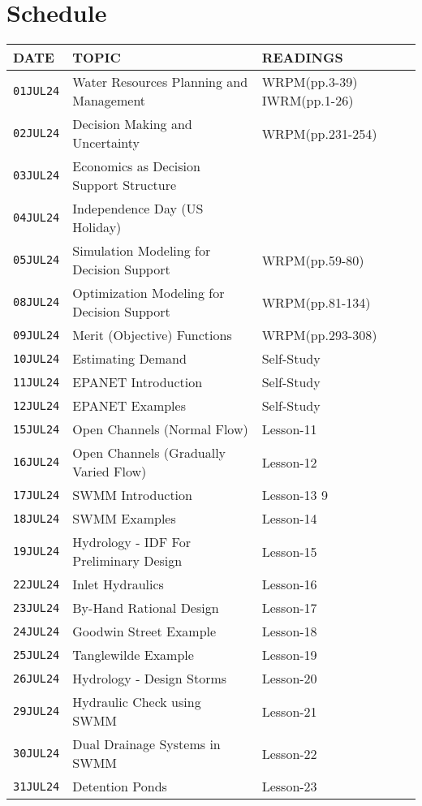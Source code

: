 \documentclass[12pt]{article}
\begin{document}
\section*{Schedule}
\begin{center}
\begin{table}[ht!]
   \begin{tabular}{| p{0.8in} | p{3.4in} | p{2.0in} |} 
\hline
\hline
DATE & TOPIC & READINGS  \\
\hline
\hline
\texttt{01JUL24} & Water Resources Planning and Management & WRPM(pp.3-39) IWRM(pp.1-26)  \\
\texttt{02JUL24} & Decision Making and Uncertainty &   WRPM(pp.231-254) ~~~~ \\
\texttt{03JUL24} & Economics as Decision Support Structure & \cite{JamesLee1971} ~~~~\\
\texttt{04JUL24} & Independence Day (US Holiday) &   \\
\texttt{05JUL24} & Simulation Modeling for Decision Support  & WRPM(pp.59-80)  \\
\hline
\hline
\texttt{08JUL24} & Optimization Modeling for Decision Support  & WRPM(pp.81-134)  \\
\texttt{09JUL24} & Merit (Objective) Functions & WRPM(pp.293-308)  \\
\texttt{10JUL24} & Estimating Demand & Self-Study  \\
\texttt{11JUL24} & EPANET Introduction & Self-Study  \\
\texttt{12JUL24} & EPANET Examples & Self-Study  \\
\hline
\hline
\texttt{15JUL24} & Open Channels (Normal Flow) & Lesson-11   \\
\texttt{16JUL24} & Open Channels (Gradually Varied Flow) & Lesson-12 \\
\texttt{17JUL24} & SWMM Introduction & Lesson-13 9 \\
\texttt{18JUL24} & SWMM Examples & Lesson-14 \\
\texttt{19JUL24} & Hydrology - IDF For Preliminary Design & Lesson-15  \\
\hline
\hline
\texttt{22JUL24} & Inlet Hydraulics & Lesson-16  \\
\texttt{23JUL24} & By-Hand Rational Design & Lesson-17  \\
\texttt{24JUL24} & Goodwin Street Example & Lesson-18  \\
\texttt{25JUL24} & Tanglewilde Example & Lesson-19  \\
\texttt{26JUL24} & Hydrology - Design Storms & Lesson-20  \\
\hline
\hline
\texttt{29JUL24} & Hydraulic Check using SWMM & Lesson-21  \\
\texttt{30JUL24} & Dual Drainage Systems in SWMM & Lesson-22  \\
\texttt{31JUL24} & Detention Ponds & Lesson-23  \\

\hline
\hline
   \end{tabular}
   \label{tab:fall2013scheduleA}
\end{table}
\end{center}
\end{document}
